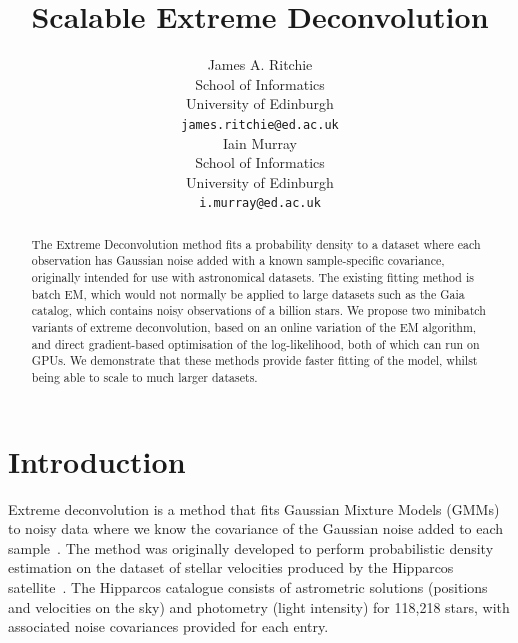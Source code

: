 \documentclass{article}
\title{Scalable Extreme Deconvolution}
\author{
  James A. Ritchie\\
  School of Informatics\\
  University of Edinburgh\\
   \texttt{james.ritchie@ed.ac.uk} \\
  \And
  Iain Murray\\
  School of Informatics\\
  University of Edinburgh\\
   \texttt{i.murray@ed.ac.uk} \\
}
\begin{document}
\maketitle

\begin{abstract}

The Extreme Deconvolution method fits a probability density to a dataset where each observation has Gaussian noise added with a known sample-specific covariance, originally intended for use with astronomical datasets.
The existing fitting method is batch EM, which would not normally be applied to large datasets such as the Gaia catalog, which contains noisy observations of a billion stars.
We propose two minibatch variants of extreme deconvolution, based on an online variation of the EM algorithm, and direct gradient-based optimisation of the log-likelihood, both of which can run on GPUs.
We demonstrate that these methods provide faster fitting of the model, whilst being able to scale to much larger datasets.

\end{abstract}

\section{Introduction}

Extreme deconvolution is a method that fits Gaussian Mixture Models (GMMs) to noisy data where we know the covariance of the Gaussian noise added to each sample~\cite{bovyExtremeDeconvolutionInferring2011}.
The method was originally developed to perform probabilistic density estimation on the dataset of stellar velocities produced by the Hipparcos satellite~\cite{perrymanHipparcosCatalogue1997}.
The Hipparcos catalogue consists of astrometric solutions (positions and velocities on the sky) and photometry (light intensity) for 118,218 stars, with associated noise covariances provided for each entry.
\end{document}
